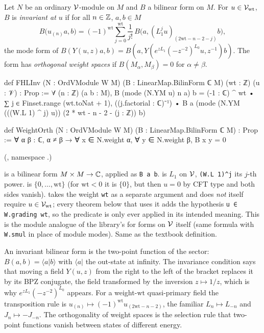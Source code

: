 \begin{definition}\label{ch09:def:FHLInv}
Let $N$ be an ordinary $\mathcal{V}$-module on $M$ and $B$ a bilinear form on $M$. For
$u\in\mathcal{V}_{\mathrm{wt}}$, $B$ is \emph{invariant at $u$} if for all $n\in{\mathbb{Z}}$, $a,b\in M$
\begin{equation}\label{ch09:eq:FHLInv}
B\big(u_{(n)}a,b\big)=(-1)^{\mathrm{wt}}\sum_{j=0}^{\mathrm{wt}}\frac1{j!}\,
B\big(a,(L_1^ju)_{(2\mathrm{wt}-n-2-j)}b\big),
\end{equation}
the mode form of $B(Y(u,z)a,b)=B(a,Y(e^{zL_1}(-z^{-2})^{L_0}u,z^{-1})b)$. The form has
\emph{orthogonal weight spaces} if $B(M_\alpha,M_\beta)=0$ for $\alpha\neq\beta$.
\end{definition}
\begin{leancode}
def FHLInv (N : OrdVModule W M) (B : LinearMap.BilinForm ℂ M) (wt : ℤ) (u : 𝒱) : Prop :=
  ∀ (n : ℤ) (a b : M), B (mode (N.YM u) n a) b
    = (-1 : ℂ) ^ wt • ∑ j ∈ Finset.range (wt.toNat + 1), ((j.factorial : ℂ)⁻¹) •
        B a (mode (N.YM (((W.L 1) ^ j) u)) (2 * wt - n - 2 - (j : ℤ)) b)

def WeightOrth (N : OrdVModule W M) (B : LinearMap.BilinForm ℂ M) : Prop :=
  ∀ α β : ℂ, α ≠ β → ∀ x ∈ N.weight α, ∀ y ∈ N.weight β, B x y = 0
\end{leancode}
(, namespace .)

\begin{dictionary}
 is a bilinear form $M\times M\to{\mathbb{C}}$, applied as \texttt{B a b}.
 is $L_1$ on $\mathcal{V}$, \texttt{(W.L 1)\^{}j} its $j$-th power.
 is $\{0,\dots,\mathrm{wt}\}$ (for $\mathrm{wt}<0$ it is
$\{0\}$, but then $u=0$ by CFT type and both sides vanish).  takes the weight
\texttt{wt} as a separate argument and does \emph{not} itself require $u\in\mathcal{V}_{\mathrm{wt}}$;
every theorem below that uses it adds the hypothesis \texttt{u ∈ W.grading wt}, so the
predicate is only ever applied in its intended meaning. This is the module analogue of the
library's  for forms on $\mathcal{V}$ itself (same formula with
\texttt{W.smul} in place of module modes). Same as the textbook definition.
\end{dictionary}

\begin{physics}
An invariant bilinear form is the two-point function of the sector: $B(a,b)=\langle a|b\rangle$ with $\langle a|$ the out-state at infinity. The invariance condition says that moving a field $Y(u,z)$ from the right to the left of the bracket replaces it by its BPZ conjugate, the field transformed by the inversion $z\mapsto1/z$, which is why $e^{zL_1}(-z^{-2})^{L_0}$ appears. For a weight-$\mathrm{wt}$ quasi-primary field the transposition rule is $u_{(n)}\mapsto(-1)^{\mathrm{wt}}u_{(2\mathrm{wt}-n-2)}$, the familiar $L_n\mapsto L_{-n}$ and $J_n\mapsto-J_{-n}$. The orthogonality of weight spaces is the selection rule that two-point functions vanish between states of different energy.
\end{physics}


